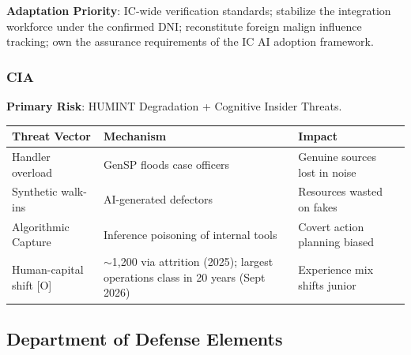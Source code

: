 \documentclass[11pt,letterpaper]{article}
\makeatletter
\newcommand{\etraneed}[1]{\par\if@nobreak\else\penalty\z@\ifdim\pagegoal<\maxdimen\ifdim\dimexpr\pagegoal-\pagetotal\relax<\dimexpr#1\relax\newpage\fi\fi\fi}
\makeatother
\begin{document}
\textbf{Adaptation Priority}: IC-wide verification standards; stabilize the integration workforce under the confirmed DNI; reconstitute foreign malign influence tracking; own the assurance requirements of the IC AI adoption framework.

\etraneed{9\baselineskip}
\subsubsection{CIA}

\textbf{Primary Risk}: HUMINT Degradation + Cognitive Insider Threats.

\begin{center}
\small
\begin{tabularx}{\linewidth}{ZY{0.78}Y{1.2}Y{1.02}}
\toprule
\textbf{Threat Vector} & \textbf{Mechanism} & \textbf{Impact} \\
\midrule
Handler overload & GenSP floods case officers & Genuine sources lost in noise \\
Synthetic walk-ins & AI-generated defectors & Resources wasted on fakes \\
Algorithmic Capture & Inference poisoning of internal tools & Covert action planning biased \\
Human-capital shift [O] & $\sim$1,200 via attrition (2025); largest operations class in 20 years (Sept 2026) & Experience mix shifts junior \\
\bottomrule
\end{tabularx}
\end{center}

\subsection{Department of Defense Elements}
\end{document}
